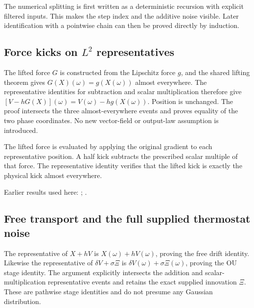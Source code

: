 \documentclass[11pt,a4paper]{report}
\begin{document}
The numerical splitting is first written as a deterministic recursion with explicit filtered inputs. This makes the step index and the additive noise visible. Later identification with a pointwise chain can then be proved directly by induction.

\subsection{\texorpdfstring{Force kicks on \(L^{2}\) representatives}{Force kicks on L² representatives}}
\label{report-step-KineticLangevin-KineticSplittingLp-lean-2}


The lifted force \(G\) is constructed from the Lipschitz force \(g\), and the shared lifting theorem gives \(G(X)(\omega)=g(X(\omega))\) almost everywhere. The representative identities for subtraction and scalar multiplication therefore give \([V-hG(X)](\omega)=V(\omega)-hg(X(\omega))\). Position is unchanged. The proof intersects the three almost-everywhere events and proves equality of the two phase coordinates. No new vector-field or output-law assumption is introduced.



The lifted force is evaluated by applying the original gradient to each representative position. A half kick subtracts the prescribed scalar multiple of that force. The representative identity verifies that the lifted kick is exactly the physical kick almost everywhere.



Earlier results used here: \cite[Section~3.13.2]{LangevinLean2026ULASC}; \cite[Section~3.13.3]{LangevinLean2026ULASC}.
\subsection{\texorpdfstring{Free transport and the full supplied thermostat noise}{Free transport and the full supplied thermostat noise}}
\label{report-step-KineticLangevin-KineticSplittingLp-lean-3}


The representative of \(X+hV\) is \(X(\omega)+hV(\omega)\), proving the free drift identity. Likewise the representative of \(\delta V+\sigma\Xi\) is \(\delta V(\omega)+\sigma\Xi(\omega)\), proving the OU stage identity. The argument explicitly intersects the addition and scalar-multiplication representative events and retains the exact supplied innovation \(\Xi\). These are pathwise stage identities and do not presume any Gaussian distribution.
\end{document}
